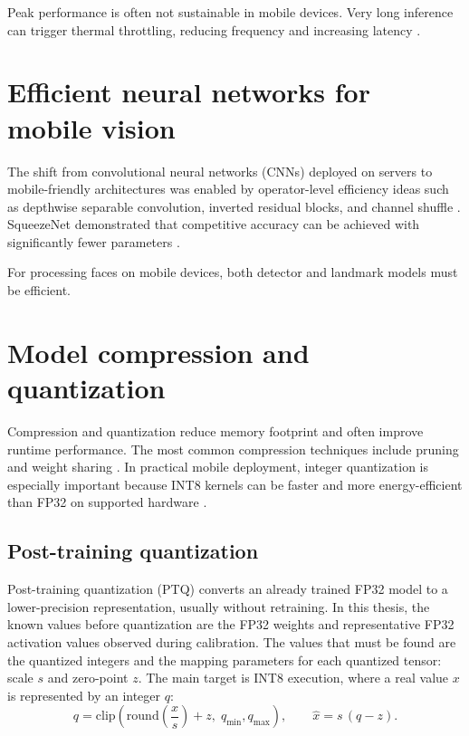 Peak performance is often not sustainable in mobile devices. Very long
inference can trigger thermal throttling, reducing frequency and increasing
latency \cite{li2024mobilebenchmark}.

\section{Efficient neural networks for mobile vision}

The shift from convolutional neural networks (CNNs) deployed on servers to mobile-friendly architectures was enabled
by operator-level efficiency ideas such as depthwise separable convolution,
inverted residual blocks, and channel shuffle
\cite{howard2017mobilenets,sandler2018mobilenetv2,zhang2018shufflenet}.
SqueezeNet demonstrated that competitive accuracy can be achieved with
significantly fewer parameters \cite{iandola2016squeezenet}.

For processing faces on mobile devices, both detector and landmark models must be efficient.

\section{Model compression and quantization}

Compression and quantization reduce memory footprint and often improve runtime
performance. The most common compression techniques include pruning and weight sharing
\cite{han2016deepcompression}. In practical mobile deployment, integer
quantization is especially important because INT8 kernels can be faster and more
energy-efficient than FP32 on supported hardware \cite{jacob2018quantization}.

\subsection{Post-training quantization}

Post-training quantization (PTQ) converts an already trained FP32 model to a
lower-precision representation, usually without retraining. In this thesis, the
known values before quantization are the FP32 weights and representative FP32
activation values observed during calibration. The values that must be found are
the quantized integers and the mapping parameters for each quantized tensor:
scale $s$ and zero-point $z$. The main target is INT8 execution, where a real
value $x$ is represented by an integer $q$:
\begin{equation}
q = \mathrm{clip}\!\left(\mathrm{round}\!\left(\frac{x}{s}\right) + z,\; q_{\min}, q_{\max}\right),
\qquad
\hat{x} = s\,(q-z).
\end{equation}

